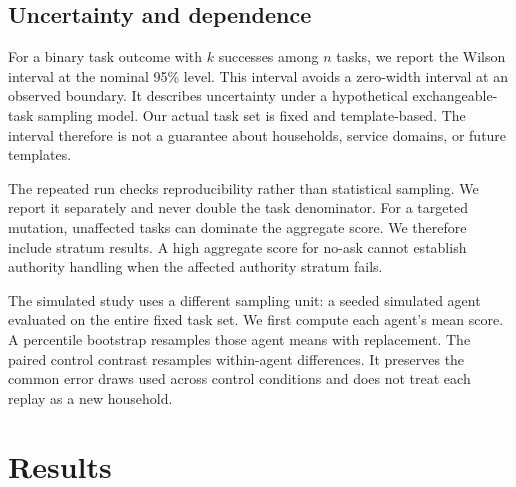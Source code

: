 \documentclass{article}
\begin{document}
\subsection{Uncertainty and dependence}
For a binary task outcome with $k$ successes among $n$ tasks, we report the Wilson interval at the nominal 95\% level. This interval avoids a zero-width interval at an observed boundary. It describes uncertainty under a hypothetical exchangeable-task sampling model. Our actual task set is fixed and template-based. The interval therefore is not a guarantee about households, service domains, or future templates.\par
The repeated run checks reproducibility rather than statistical sampling. We report it separately and never double the task denominator. For a targeted mutation, unaffected tasks can dominate the aggregate score. We therefore include stratum results. A high aggregate score for no-ask cannot establish authority handling when the affected authority stratum fails.\par
The simulated study uses a different sampling unit: a seeded simulated agent evaluated on the entire fixed task set. We first compute each agent's mean score. A percentile bootstrap resamples those agent means with replacement. The paired control contrast resamples within-agent differences. It preserves the common error draws used across control conditions and does not treat each replay as a new household.\par
\section{Results}
\end{document}
